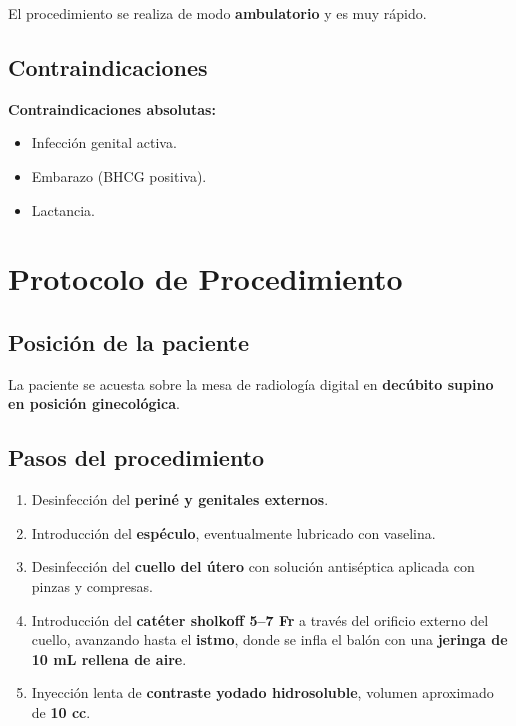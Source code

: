 El procedimiento se realiza de modo \textbf{ambulatorio} y es muy rápido.

\clearpage

\subsection*{Contraindicaciones}

\begin{cajariesgo}
\textbf{Contraindicaciones absolutas:}
\begin{itemize}[noitemsep, topsep=2pt]
  \item Infección genital activa.
  \item Embarazo (BHCG positiva).
  \item Lactancia.
\end{itemize}
\end{cajariesgo}

\clearpage
\section*{Protocolo de Procedimiento}

\subsection*{Posición de la paciente}

La paciente se acuesta sobre la mesa de radiología digital en \textbf{decúbito supino en posición ginecológica}.

\subsection*{Pasos del procedimiento}

\begin{enumerate}[noitemsep]
  \item Desinfección del \textbf{periné y genitales externos}.
  \item Introducción del \textbf{espéculo}, eventualmente lubricado con vaselina.
  \item Desinfección del \textbf{cuello del útero} con solución antiséptica aplicada con pinzas y compresas.
  \item Introducción del \textbf{catéter sholkoff 5--7 Fr} a través del orificio externo del cuello, avanzando hasta el \textbf{istmo}, donde se infla el balón con una \textbf{jeringa de 10 mL rellena de aire}.
  \item Inyección lenta de \textbf{contraste yodado hidrosoluble}, volumen aproximado de \textbf{10 cc}.
\end{enumerate}

